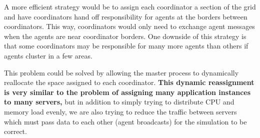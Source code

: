 A more efficient strategy would be to assign each coordinator a section of the grid and have
coordinators hand off responsibility for agents at the borders between coordinators. This way,
coordinators would only need to exchange agent messages when the agents are near coordinator
borders. One downside of this strategy is that some coordinators may be responsible for many more
agents than others if agents cluster in a few areas.

This problem could be solved by allowing the master process to dynamically reallocate the space
assigned to each coordinator. \textbf{This dynamic reassignment is very similar to the problem of
assigning many application instances to many servers,} but in addition to simply trying to
distribute CPU and memory load evenly, we are also trying to reduce the traffic between servers
which must pass data to each other (agent broadcasts) for the simulation to be correct.
